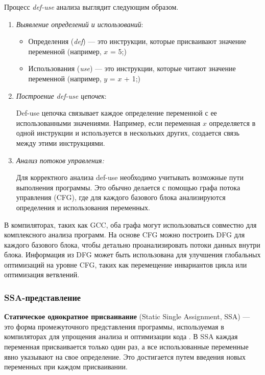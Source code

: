 Процесс \textit{def-use} анализа выглядит следующим образом.
\begin{enumerate}
    \item \textit{Выявление определений и использований}:
        \begin{itemize}
            \item Определения (\textit{def}) — это инструкции, которые присваивают значение переменной (например, $x$ = 5;)
            \item Использования (\textit{use}) — это инструкции, которые читают значение переменной (например, $y$ = $x$ + 1;)
        \end{itemize}
    \item \textit{Построение def-use цепочек}:

    Def-use цепочка связывает каждое определение переменной с ее использованными значениями. Например, если переменная $x$ определяется в одной инструкции и используется в нескольких других, создается связь между этими инструкциями.
    \item \textit{Анализ потоков управления:}
    
    Для корректного анализа def-use необходимо учитывать возможные пути выполнения программы. Это обычно делается с помощью графа потока управления (CFG), где для каждого базового блока анализируются определения и использования переменных.
\end{enumerate}

В компиляторах, таких как GCC, оба графа могут использоваться совместно для комплексного анализа программ. На основе CFG можно построить DFG для каждого базового блока, чтобы детально проанализировать потоки данных внутри блока. Информация из DFG может быть использована для улучшения глобальных оптимизаций на уровне CFG, таких как перемещение инвариантов цикла или оптимизация ветвлений.

\subsubsection{SSA-представление}

\textbf{Статическое однократное присваивание} (Static Single Assignment, SSA) — это форма промежуточного представления программы, используемая в компиляторах для упрощения анализа и оптимизации кода \cite{cytron1991efficiently}. В SSA каждая переменная присваивается только один раз, а все использованные переменные явно указывают на свое определение. Это достигается путем введения новых переменных при каждом присваивании.

